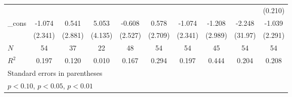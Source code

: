 {\begin{tabular}{l*{9}{c}}
            &                     &                     &                     &                     &                     &                     &                     &                     &     (0.210)         \\
[1em]
\_cons      &      -1.074         &       0.541         &       5.053         &      -0.608         &       0.578         &      -1.074         &      -1.208         &      -2.248         &      -1.039         \\
            &     (2.341)         &     (2.881)         &     (4.135)         &     (2.527)         &     (2.709)         &     (2.341)         &     (2.989)         &     (31.97)         &     (2.291)         \\
\hline
\(N\)       &          54         &          37         &          22         &          48         &          54         &          54         &          45         &          54         &          54         \\
\(R^{2}\)   &       0.197         &       0.120         &       0.010         &       0.167         &       0.294         &       0.197         &       0.444         &       0.204         &       0.208         \\
\hline\hline
\multicolumn{10}{l}{\footnotesize Standard errors in parentheses}\\
\multicolumn{10}{l}{\footnotesize \sym{*} \(p<0.10\), \sym{**} \(p<0.05\), \sym{***} \(p<0.01\)}\\
\end{tabular}
}
